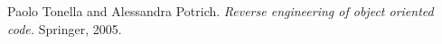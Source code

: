 \begin{thebibliography}{9}
Paolo Tonella and Alessandra Potrich. \emph{Reverse engineering of object oriented code.} Springer, 2005.
\end{thebibliography}